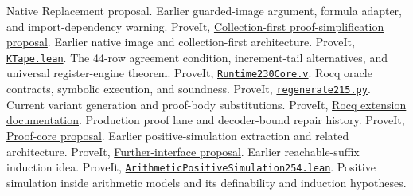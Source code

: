 \documentclass[11pt,a4paper]{article}
\newcommand{\repo}{https://github.com/VladimirReshetnikov/ProveIt}
\newcommand{\pin}{cbf94cb552a3b49509e0eee80e7455d4eb5974c6}
\newcommand{\src}[2]{\href{\repo/blob/\pin/#1}{#2}}
\theoremstyle{remark}
\begin{document}
\begin{thebibliography}{99}
{Native Replacement proposal}.
Earlier guarded-image argument, formula adapter, and import-dependency warning.
ProveIt,
\src{Computability/BusyBeaver/Research/ZFC/k225-formal/verification/k215/simplification/proposals/collection-first/K215_Proof_Simplification_Report.tex}
{Collection-first proof-simplification proposal}.
Earlier native image and collection-first architecture.
ProveIt, \src{Computability/BusyBeaver/Lean/BusyBeaver/ZFC/KTape.lean}
{\texttt{KTape.lean}}.
The 44-row agreement condition, increment-tail alternatives, and universal
register-engine theorem.
ProveIt,
\src{Computability/BusyBeaver/Research/ZFC/k225-formal/rocq/rocq-extension/coq/215/Runtime230Core.v}
{\texttt{Runtime230Core.v}}.
Rocq oracle contracts, symbolic execution, and soundness.
ProveIt,
\src{Computability/BusyBeaver/Research/ZFC/k225-formal/rocq/rocq-extension/regenerate215.py}
{\texttt{regenerate215.py}}.
Current variant generation and proof-body substitutions.
ProveIt,
\src{Computability/BusyBeaver/Research/ZFC/k225-formal/verification/k215/rocq/README.md}
{Rocq extension documentation}.
Production proof lane and decoder-bound repair history.
ProveIt,
\src{Computability/BusyBeaver/Research/ZFC/k225-formal/verification/k215/simplification/proposals/proof-core/report.tex}
{Proof-core proposal}.
Earlier positive-simulation extraction and related architecture.
ProveIt,
\src{Computability/BusyBeaver/Research/ZFC/k225-formal/verification/k215/simplification/proposals/further-interface/report.tex}
{Further-interface proposal}.
Earlier reachable-suffix induction idea.
ProveIt,
\src{Computability/BusyBeaver/Lean/BusyBeaver/ZFC/ArithmeticPositiveSimulation254.lean}
{\texttt{ArithmeticPositiveSimulation254.lean}}.
Positive simulation inside arithmetic models and its definability and
induction hypotheses.
\end{thebibliography}
\end{document}

